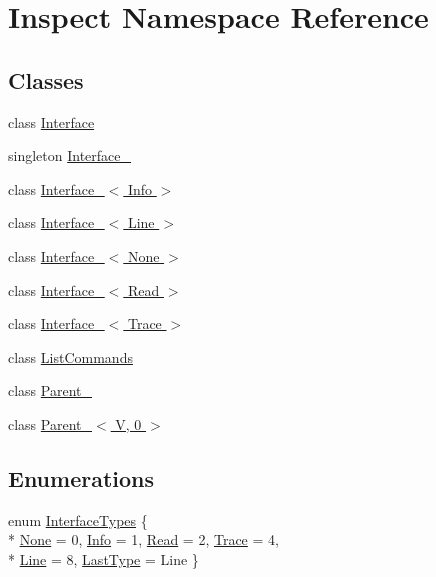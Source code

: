 \hypertarget{namespace_inspect}{\section{Inspect Namespace Reference}
\label{namespace_inspect}
}
\subsection*{Classes}
\begin{DoxyCompactItemize}
\item 
class \hyperlink{class_inspect_1_1_interface}{Interface}
\item 
singleton \hyperlink{singleton_inspect_1_1_interface__}{Interface\+\_\+}
\item 
class \hyperlink{class_inspect_1_1_interface___3_01_info_01_4}{Interface\+\_\+$<$ Info $>$}
\item 
class \hyperlink{class_inspect_1_1_interface___3_01_line_01_4}{Interface\+\_\+$<$ Line $>$}
\item 
class \hyperlink{class_inspect_1_1_interface___3_01_none_01_4}{Interface\+\_\+$<$ None $>$}
\item 
class \hyperlink{class_inspect_1_1_interface___3_01_read_01_4}{Interface\+\_\+$<$ Read $>$}
\item 
class \hyperlink{class_inspect_1_1_interface___3_01_trace_01_4}{Interface\+\_\+$<$ Trace $>$}
\item 
class \hyperlink{class_inspect_1_1_list_commands}{List\+Commands}
\item 
class \hyperlink{class_inspect_1_1_parent__}{Parent\+\_\+}
\item 
class \hyperlink{class_inspect_1_1_parent___3_01_v_00_010_01_4}{Parent\+\_\+$<$ V, 0 $>$}
\end{DoxyCompactItemize}
\subsection*{Enumerations}
\begin{DoxyCompactItemize}
\item 
enum \hyperlink{namespace_inspect_a1ccfa0c03983d0487626cf4e4c58947d}{Interface\+Types} \{ \\*
\hyperlink{namespace_inspect_a1ccfa0c03983d0487626cf4e4c58947dad13412f7e95c9049f7e0bb7cd6b63943}{None} = 0, 
\hyperlink{namespace_inspect_a1ccfa0c03983d0487626cf4e4c58947daf631f67820a39efb59433f92bea210f9}{Info} = 1, 
\hyperlink{namespace_inspect_a1ccfa0c03983d0487626cf4e4c58947da636fff99155f8ae2c39124b955da4ea8}{Read} = 2, 
\hyperlink{namespace_inspect_a1ccfa0c03983d0487626cf4e4c58947daf19190bda50293d23c7cd6e29f4eeb6a}{Trace} = 4, 
\\*
\hyperlink{namespace_inspect_a1ccfa0c03983d0487626cf4e4c58947dadc867edf671761c755c2b682f8c27b9b}{Line} = 8, 
\hyperlink{namespace_inspect_a1ccfa0c03983d0487626cf4e4c58947da05f1063aa44fff5f0aeae793419bad5c}{Last\+Type} = Line
 \}
\end{DoxyCompactItemize}


